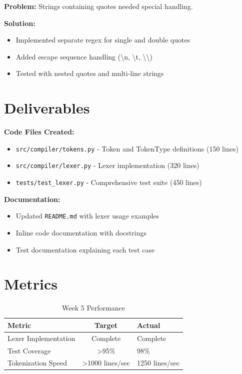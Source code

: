 \documentclass[a4paper,11pt]{article}
\begin{document}
\textbf{Problem:} Strings containing quotes needed special handling.

\textbf{Solution:}
\begin{itemize}[leftmargin=*]
    \item Implemented separate regex for single and double quotes
    \item Added escape sequence handling (\textbackslash n, \textbackslash t, \textbackslash \textbackslash)
    \item Tested with nested quotes and multi-line strings
\end{itemize}

\section{Deliverables}

\textbf{Code Files Created:}
\begin{itemize}[leftmargin=*]
    \item \texttt{src/compiler/tokens.py} - Token and TokenType definitions (150 lines)
    \item \texttt{src/compiler/lexer.py} - Lexer implementation (320 lines)
    \item \texttt{tests/test\_lexer.py} - Comprehensive test suite (450 lines)
\end{itemize}

\textbf{Documentation:}
\begin{itemize}[leftmargin=*]
    \item Updated \texttt{README.md} with lexer usage examples
    \item Inline code documentation with docstrings
    \item Test documentation explaining each test case
\end{itemize}

\section{Metrics}

\begin{table}[h]
\centering
\begin{tabularx}{\textwidth}{|l|c|X|}
\hline
\rowcolor{blue!10}
\textbf{Metric} & \textbf{Target} & \textbf{Actual} \\
\hline
Lexer Implementation & Complete & Complete \\
\hline
Test Coverage & >95\% & 98\% \\
\hline
Tokenization Speed & >1000 lines/sec & 1250 lines/sec \\
\hline
\end{tabularx}
\caption{Week 5 Performance}
\end{table}
\end{document}
